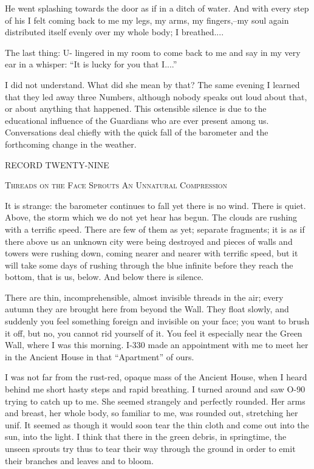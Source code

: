 \documentclass[11pt,openany]{book}
\begin{document}
He went splashing towards the door as if in a ditch of water. And with every step of his I felt coming back to me my legs, my arms, my fingers,--my soul again distributed itself evenly over my whole body; I breathed....

The last thing: U- lingered in my room to come back to me and say in my very ear in a whisper: ``It is lucky for you that I....''

I did not understand. What did she mean by that? The same evening I learned that they led away three Numbers, although nobody speaks out loud about that, or about anything that happened. This ostensible silence is due to the educational influence of the Guardians who are ever present among us. Conversations deal chiefly with the quick fall of the barometer and the forthcoming change in the weather.

\begin{center}\textsc{RECORD TWENTY-NINE}\end{center}

\begin{center}\textsc{Threads on the Face Sprouts An Unnatural Compression}\end{center}

It is strange: the barometer continues to fall yet there is no wind. There is quiet. Above, the storm which we do not yet hear has begun. The clouds are rushing with a terrific speed. There are few of them as yet; separate fragments; it is as if there above us an unknown city were being destroyed and pieces of walls and towers were rushing down, coming nearer and nearer with terrific speed, but it will take some days of rushing through the blue infinite before they reach the bottom, that is us, below. And below there is silence.

There are thin, incomprehensible, almost invisible threads in the air; every autumn they are brought here from beyond the Wall. They float slowly, and suddenly you feel something foreign and invisible on your face; you want to brush it off, but no, you cannot rid yourself of it. You feel it especially near the Green Wall, where I was this morning. I-330 made an appointment with me to meet her in the Ancient House in that ``Apartment'' of ours.

I was not far from the rust-red, opaque mass of the Ancient House, when I heard behind me short hasty steps and rapid breathing. I turned around and saw O-90 trying to catch up to me. She seemed strangely and perfectly rounded. Her arms and breast, her whole body, so familiar to me, was rounded out, stretching her unif. It seemed as though it would soon tear the thin cloth and come out into the sun, into the light. I think that there in the green debris, in springtime, the unseen sprouts try thus to tear their way through the ground in order to emit their branches and leaves and to bloom.
\end{document}
